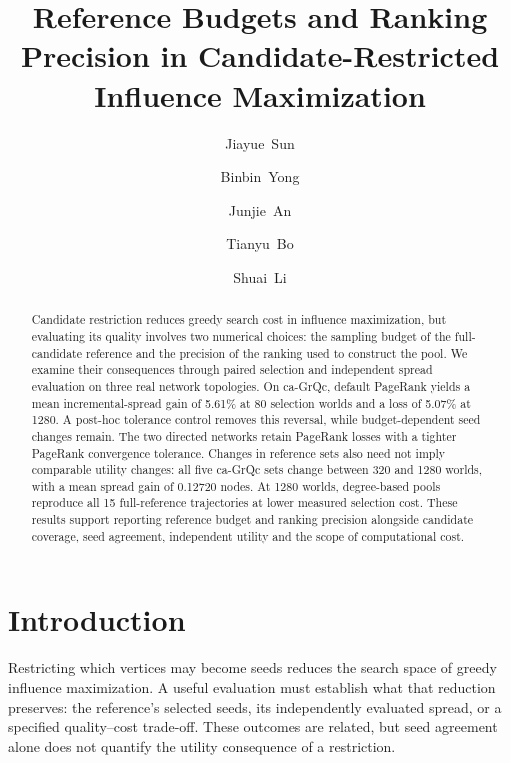 \documentclass[smallextended]{svjour3}
\begin{document}
\title{Reference Budgets and Ranking Precision in Candidate-Restricted Influence Maximization}
\author{\mbox{Jiayue Sun} \and \mbox{Binbin Yong} \and \mbox{Junjie An} \and \mbox{Tianyu Bo} \and \mbox{Shuai Li}}
\date{}
\maketitle
\begin{abstract}
Candidate restriction reduces greedy search cost in influence maximization, but evaluating its quality involves two numerical choices: the sampling budget of the full-candidate reference and the precision of the ranking used to construct the pool. We examine their consequences through paired selection and independent spread evaluation on three real network topologies. On ca-GrQc, default PageRank yields a mean incremental-spread gain of 5.61\% at 80 selection worlds and a loss of 5.07\% at 1280. A post-hoc tolerance control removes this reversal, while budget-dependent seed changes remain. The two directed networks retain PageRank losses with a tighter PageRank convergence tolerance. Changes in reference sets also need not imply comparable utility changes: all five ca-GrQc sets change between 320 and 1280 worlds, with a mean spread gain of 0.12720 nodes. At 1280 worlds, degree-based pools reproduce all 15 full-reference trajectories at lower measured selection cost. These results support reporting reference budget and ranking precision alongside candidate coverage, seed agreement, independent utility and the scope of computational cost.
\end{abstract}

\section{Introduction}
Restricting which vertices may become seeds reduces the search space of greedy influence maximization. A useful evaluation must establish what that reduction preserves: the reference's selected seeds, its independently evaluated spread, or a specified quality--cost trade-off. These outcomes are related, but seed agreement alone does not quantify the utility consequence of a restriction.
\end{document}
